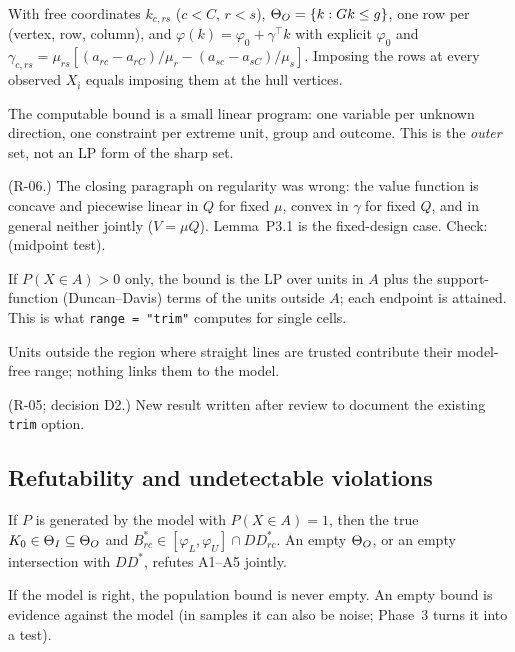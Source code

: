 \begin{result}\label{res:p2a-p7}
 With free coordinates $k_{c,rs}$ ($c<C$, $r<s$),
$\Theta_O=\{k:Gk\le g\}$, one row per (vertex, row, column), and
$\varphi(k)=\varphi_0+\gamma^\top k$ with explicit $\varphi_0$ and
$\gamma_{c,rs}=\mu_{rs}[(a_{rc}-a_{rC})/\mu_r-(a_{sc}-a_{sC})/\mu_s]$. Imposing
the rows at every observed $X_i$ equals imposing them at the hull vertices.
\end{result}
\begin{plain}
The computable bound is a small linear program: one variable per unknown
direction, one constraint per extreme unit, group and outcome. This is the
\emph{outer} set, not an LP form of the sharp set.
\end{plain}
\begin{revnote}
(R-06.) The closing paragraph on regularity was wrong: the value function is
concave and piecewise linear in $Q$ for fixed $\mu$, convex in $\gamma$ for
fixed $Q$, and in general neither jointly ($V=\mu Q$). Lemma~P3.1 is the
fixed-design case. Check:  (midpoint test).
\end{revnote}

\begin{result}
 If $P(X\in A)>0$ only, the bound is the LP over units in $A$
plus the support-function (Duncan--Davis) terms of the units outside $A$; each
endpoint is attained. This is what \texttt{range = "trim"} computes for single
cells.
\end{result}
\begin{plain}
Units outside the region where straight lines are trusted contribute their
model-free range; nothing links them to the model.
\end{plain}
\begin{revnote}
(R-05; decision D2.) New result written after review to document the existing
\texttt{trim} option.
\end{revnote}

\subsection{Refutability and undetectable violations}

\begin{result}
 If $P$ is generated by the model with $P(X\in A)=1$, then the
true $K_0\in\Theta_I\subseteq\Theta_O$ and $B^*_{rc}\in[\varphi_L,\varphi_U]\cap DD^*_{rc}$.
An empty $\Theta_O$, or an empty intersection with $DD^*$, refutes A1--A5 jointly.
\end{result}
\begin{plain}
If the model is right, the population bound is never empty. An empty bound is
evidence against the model (in samples it can also be noise; Phase~3 turns it
into a test).
\end{plain}

